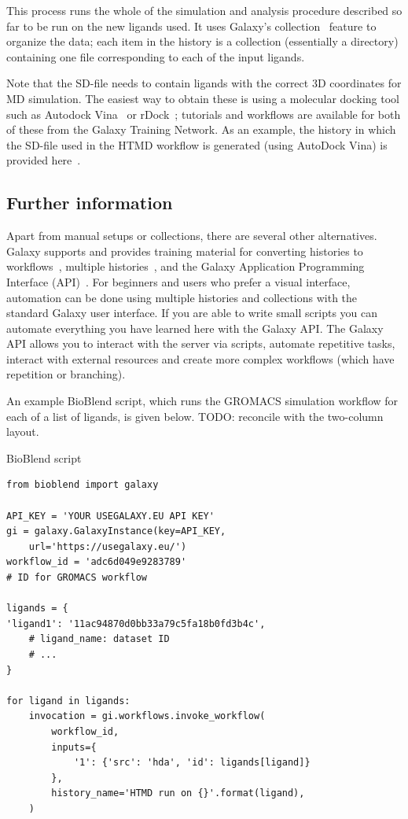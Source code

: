 \documentclass[twocolumn]{bmcart}%
\begin{document}
This process runs the whole of the simulation and analysis procedure described so far to be run on the new ligands used. It uses Galaxy's collection~\cite{gtn_collections} feature to organize the data; each item in the history is a collection (essentially a directory) containing one file corresponding to each of the input ligands.

Note that the SD-file needs to contain ligands with the correct 3D coordinates for MD simulation. The easiest way to obtain these is using a molecular docking tool such as Autodock Vina~\cite{Trott2009} or rDock~\cite{Ruiz2014}; tutorials and workflows are available for both of these from the Galaxy Training Network. As an example, the history in which the SD-file used in the HTMD workflow is generated (using AutoDock Vina) is provided here~\cite{eu_6hhr}.

\subsection*{Further information}

Apart from manual setups or collections, there are several other alternatives. Galaxy supports and provides training material for converting histories to workflows~\cite{gtn_toworkflow}, multiple histories~\cite{gtn_multiple}, and the Galaxy Application Programming Interface (API)~\cite{gtn_api}. For beginners and users who prefer a visual interface, automation can be done using multiple histories and collections with the standard Galaxy user interface. If you are able to write small scripts you can automate everything you have learned here with the Galaxy API. The Galaxy API allows you to interact with the server via scripts, automate repetitive tasks, interact with external resources and create more complex workflows (which have repetition or branching).

An example BioBlend script, which runs the GROMACS simulation workflow for each of a list of ligands, is given below. TODO: reconcile with the two-column layout.

\begin{handson_box_colour}{BioBlend script}
\begin{verbatim} 
from bioblend import galaxy

API_KEY = 'YOUR USEGALAXY.EU API KEY'
gi = galaxy.GalaxyInstance(key=API_KEY,
    url='https://usegalaxy.eu/')
workflow_id = 'adc6d049e9283789' 
# ID for GROMACS workflow

ligands = {
'ligand1': '11ac94870d0bb33a79c5fa18b0fd3b4c',
    # ligand_name: dataset ID
    # ...
}

for ligand in ligands:
    invocation = gi.workflows.invoke_workflow(
        workflow_id,
        inputs={
            '1': {'src': 'hda', 'id': ligands[ligand]}
        },
        history_name='HTMD run on {}'.format(ligand),
    )
\end{verbatim}
\end{handson_box_colour}
\end{document}
